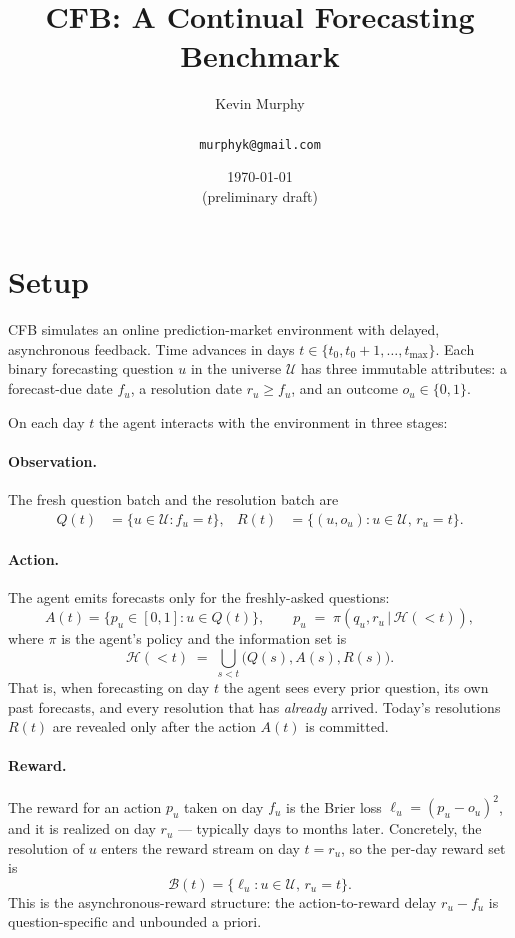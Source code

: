 \documentclass[11pt]{article}
\title{CFB: A Continual Forecasting Benchmark}
\author{Kevin Murphy \\\\ \texttt{murphyk@gmail.com}}
\date{\today \\ {\small (preliminary draft)}}
\begin{document}
\maketitle

\section{Setup}
\label{sec:setup}

CFB simulates an online prediction-market environment with delayed,
asynchronous feedback. Time advances in days $t \in \{t_0, t_0+1, \dots, t_{\max}\}$.
Each binary forecasting question $u$ in the universe $\mathcal{U}$ has
three immutable attributes: a forecast-due date $f_u$, a resolution date
$r_u \ge f_u$, and an outcome $o_u \in \{0, 1\}$.

On each day $t$ the agent interacts with the environment in three stages:

\paragraph{Observation.}
The fresh question batch and the resolution batch are
\begin{align}
  Q(t) &= \{ u \in \mathcal{U} : f_u = t \}, &
  R(t) &= \{ (u, o_u) : u \in \mathcal{U},\, r_u = t \}.
\end{align}

\paragraph{Action.}
The agent emits forecasts only for the freshly-asked questions:
\begin{equation}
  A(t) = \{ p_u \in [0, 1] : u \in Q(t) \},
  \qquad
  p_u \;=\; \pi\!\left(q_u, r_u \,\big|\, \mathcal{H}(<t)\right),
\end{equation}
where $\pi$ is the agent's policy and the information set is
\begin{equation}
  \mathcal{H}(<t) \;=\; \bigcup_{s < t} \big(Q(s), A(s), R(s)\big).
\end{equation}
That is, when forecasting on day $t$ the agent sees every prior question,
its own past forecasts, and every resolution that has \emph{already}
arrived. Today's resolutions $R(t)$ are revealed only after the action
$A(t)$ is committed.

\paragraph{Reward.}
The reward for an action $p_u$ taken on day $f_u$ is the Brier loss
$\ell_u = (p_u - o_u)^2$, and it is realized on day $r_u$ — typically days
to months later. Concretely, the resolution of $u$ enters the reward
stream on day $t = r_u$, so the per-day reward set is
\begin{equation}
  \mathcal{B}(t) = \{ \ell_u : u \in \mathcal{U},\, r_u = t \}.
\end{equation}
This is the asynchronous-reward structure: the action-to-reward delay
$r_u - f_u$ is question-specific and unbounded a priori.
\end{document}
